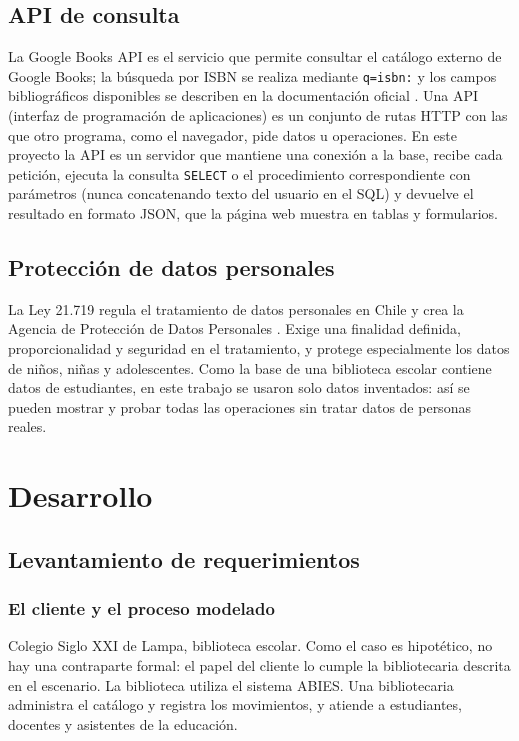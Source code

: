 \documentclass[11pt,a4paper]{article}
\begin{document}
\subsection{API de consulta}
La Google Books API es el servicio que permite consultar el catálogo externo de Google Books; la búsqueda por ISBN se realiza mediante \texttt{q=isbn:} y los campos bibliográficos disponibles se describen en la documentación oficial \cite{gbusing,gbvolumes}. Una API (interfaz de programación de aplicaciones) es un conjunto de rutas HTTP con las que otro programa, como el navegador, pide datos u operaciones. En este proyecto la API es un servidor que mantiene una conexión a la base, recibe cada petición, ejecuta la consulta \texttt{SELECT} o el procedimiento correspondiente con parámetros (nunca concatenando texto del usuario en el SQL) y devuelve el resultado en formato JSON, que la página web muestra en tablas y formularios.

\subsection{Protección de datos personales}
La Ley 21.719 regula el tratamiento de datos personales en Chile y crea la Agencia de Protección de Datos Personales \cite{ley21719}. Exige una finalidad definida, proporcionalidad y seguridad en el tratamiento, y protege especialmente los datos de niños, niñas y adolescentes. Como la base de una biblioteca escolar contiene datos de estudiantes, en este trabajo se usaron solo datos inventados: así se pueden mostrar y probar todas las operaciones sin tratar datos de personas reales.

\section{Desarrollo}

\subsection{Levantamiento de requerimientos}

\subsubsection{El cliente y el proceso modelado}
Colegio Siglo XXI de Lampa, biblioteca escolar. Como el caso es hipotético, no hay una contraparte formal: el papel del cliente lo cumple la bibliotecaria descrita en el escenario. La biblioteca utiliza el sistema ABIES. Una bibliotecaria administra el catálogo y registra los movimientos, y atiende a estudiantes, docentes y asistentes de la educación.
\end{document}
